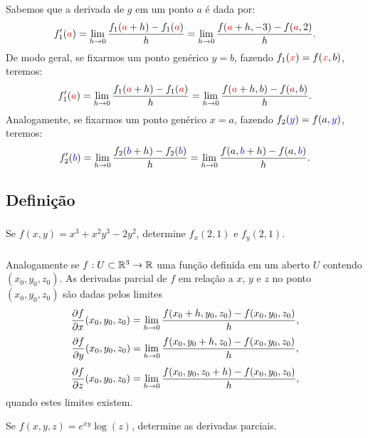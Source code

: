 \begin{frame}[label=der-parciais]
	Sabemos que a derivada de $g$ em um ponto {\color{red} $a$} é dada por:
	\[f_1'({\color{red}a})=\lim\limits_{h\to0}\frac{f_1({\color{red}a}+h)-f_1({\color{red}a})}{h}=\lim\limits_{h\to0}\frac{f({\color{red}a}+h,-3)-f({\color{red}a},2)}{h}.\]
	De modo geral, se fixarmos um ponto genérico $y=b$, fazendo $f_1({\color{red}x})=f({\color{red}x},b)$, teremos:
	\[f_1'({\color{red}a})=\lim\limits_{h\to0}\frac{f_1({\color{red}a}+h)-f_1({\color{red}a})}{h}=\lim\limits_{h\to0}\frac{f({\color{red}a}+h,b)-f({\color{red}a},b)}{h}.\]
	Analogamente, se fixarmos um ponto genérico $x=a$, fazendo $f_2({\color{blue}y})=f(a,{\color{blue}y})$, teremos:
	\[f_2'({\color{blue}b})=\lim\limits_{h\to0}\frac{f_2({\color{blue}b}+h)-f_2({\color{blue}b})}{h}=\lim\limits_{h\to0}\frac{f(a,{\color{blue}b}+h)-f(a,{\color{blue}b})}{h}.\]
\end{frame}

\subsection*{Definição}
\begin{frame}[label=der-parciais]
		\frametitle{}
		
\begin{exe}
Se $f(x,y)=x^3+x^2y^3-2y^2$, determine $f_x(2,1)$ e $f_y(2,1)$.
\end{exe}
\end{frame}


\begin{frame}[label=der-parciais]
	\frametitle{ }
	Analogamente se $f:U\subset\mathbb{R}^3\to \mathbb{R}$ uma função definida em um aberto $U$ contendo $(x_0,y_0,z_0)$. As derivadas parcial de $f$ em relação a $x$, $y$ e $z$  no ponto $(x_0,y_0,z_0)$ são dadas pelos limites
\[\frac{\partial f}{\partial x}(x_0,y_0,z_0)=\lim_{h\to 0}\frac{f(x_0+h,y_0,z_0)-f(x_0,y_0,z_0)}{h},\]
\[\frac{\partial f}{\partial y}(x_0,y_0,z_0)=\lim_{h\to 0}\frac{f(x_0,y_0+h,z_0)-f(x_0,y_0,z_0)}{h},\]
\[\frac{\partial f}{\partial z}(x_0,y_0,z_0)=\lim_{h\to 0}\frac{f(x_0,y_0,z_0+h)-f(x_0,y_0,z_0)}{h},\]
	quando estes limites existem. 
	
\begin{exe}
Se $f(x,y,z)=e^{xy}\log(z)$, determine as derivadas parciais.
\end{exe}
	
\end{frame}


